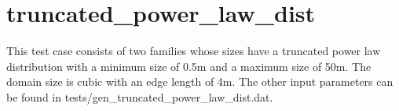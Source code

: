 \documentclass[letterpaper,10pt,english]{sphinxmanual}
\begin{document}
{\hfill{}\hfill}

\begin{DUlineblock}{0em}
\item[] 
\item[] 
\end{DUlineblock}


\section{truncated\_power\_law\_dist}
\label{tutorial:truncated-power-law-dist}
This test case consists of two families whose sizes have a truncated power law distribution with a minimum size of 0.5m and a maximum size of 50m. The domain size is cubic with an edge length of 4m. The other input parameters can be found in tests/gen\_truncated\_power\_law\_dist.dat.

{\hfill{}\hfill}

\begin{DUlineblock}{0em}
\item[] 
\item[] 
\end{DUlineblock}

{\hfill{}\hfill}
\end{document}
